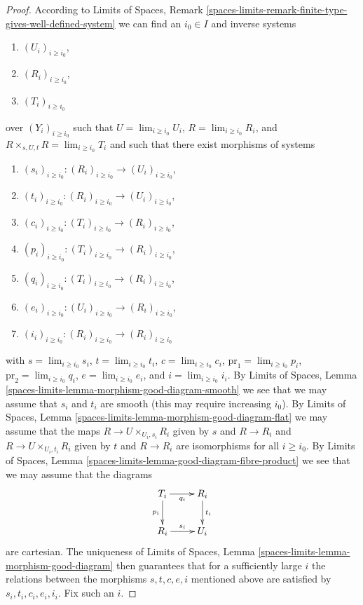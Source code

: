 \documentclass[10pt,a4paper]{amsart}
\theoremstyle{plain}
\theoremstyle{definition}
\theoremstyle{remark}
\numberwithin{equation}{subsection}
\def\lim{\mathop{\mathrm{lim}}\nolimits}
\begin{document}
\begin{proof}
\medskip\noindent
According to Limits of Spaces, Remark
\ref{spaces-limits-remark-finite-type-gives-well-defined-system}
we can find an $i_0 \in I$ and inverse systems
\begin{enumerate}
\item $(U_i)_{i \geq i_0}$,
\item $(R_i)_{i \geq i_0}$,
\item $(T_i)_{i \geq i_0}$
\end{enumerate}
over $(Y_i)_{i \geq i_0}$ such that
$U = \lim_{i \geq i_0} U_i$,
$R = \lim_{i \geq i_0} R_i$, and
$R \times_{s, U, t} R = \lim_{i \geq i_0} T_i$
and such that there exist morphisms of systems
\begin{enumerate}
\item $(s_i)_{i \geq i_0} : (R_i)_{i \geq i_0} \to (U_i)_{i \geq i_0}$,
\item $(t_i)_{i \geq i_0} : (R_i)_{i \geq i_0} \to (U_i)_{i \geq i_0}$,
\item $(c_i)_{i \geq i_0} : (T_i)_{i \geq i_0} \to (R_i)_{i \geq i_0}$,
\item $(p_i)_{i \geq i_0} : (T_i)_{i \geq i_0} \to (R_i)_{i \geq i_0}$,
\item $(q_i)_{i \geq i_0} : (T_i)_{i \geq i_0} \to (R_i)_{i \geq i_0}$,
\item $(e_i)_{i \geq i_0} : (U_i)_{i \geq i_0} \to (R_i)_{i \geq i_0}$,
\item $(i_i)_{i \geq i_0} : (R_i)_{i \geq i_0} \to (R_i)_{i \geq i_0}$
\end{enumerate}
with
$s = \lim_{i \geq i_0} s_i$,
$t = \lim_{i \geq i_0} t_i$,
$c = \lim_{i \geq i_0} c_i$,
$\text{pr}_1 = \lim_{i \geq i_0} p_i$,
$\text{pr}_2 = \lim_{i \geq i_0} q_i$,
$e = \lim_{i \geq i_0} e_i$, and
$i = \lim_{i \geq i_0} i_i$.
By Limits of Spaces, Lemma
\ref{spaces-limits-lemma-morphism-good-diagram-smooth}
we see that we may assume that $s_i$ and $t_i$ are smooth
(this may require increasing $i_0$).
By Limits of Spaces, Lemma
\ref{spaces-limits-lemma-morphism-good-diagram-flat}
we may assume that the maps
$R \to U \times_{U_i, s_i} R_i$ given by $s$ and $R \to R_i$ and
$R \to U \times_{U_i, t_i} R_i$ given by $t$ and $R \to R_i$
are isomorphisms for all $i \geq i_0$.
By Limits of Spaces, Lemma \ref{spaces-limits-lemma-good-diagram-fibre-product}
we see that we may assume that the diagrams
$$
\xymatrix{
T_i \ar[r]_{q_i} \ar[d]_{p_i} & R_i \ar[d]^{t_i} \\
R_i \ar[r]^{s_i} & U_i
}
$$
are cartesian. The uniqueness of
Limits of Spaces, Lemma \ref{spaces-limits-lemma-morphism-good-diagram}
then guarantees that for a sufficiently large $i$
the relations between the morphisms $s, t, c, e, i$ mentioned above
are satisfied by $s_i, t_i, c_i, e_i, i_i$. Fix such an $i$.


\end{proof}
\end{document}
